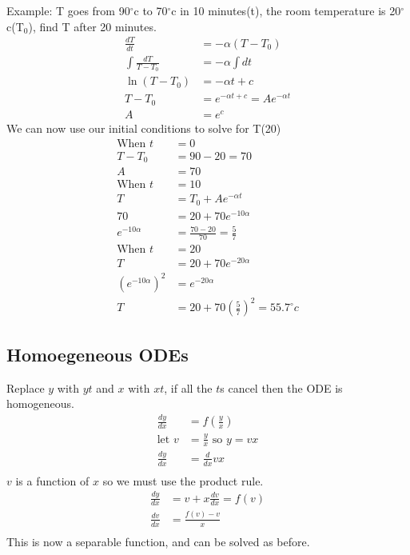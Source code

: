 \documentclass{article}
\begin{document}
Example:
T goes from 90$^\circ$c to 70$^\circ$c in 10 minutes(t), 
the room temperature is 20$^\circ$c(T$_0$), find T after 20 minutes.
\begin{align*}
    \frac{dT}{dt} &= -\alpha(T-T_0)\\
    \int \frac{dT}{T-T_0} &= -\alpha \int dt\\
    \ln(T-T_0) &= -\alpha t + c\\
    T-T_0 &= e^{-\alpha t + c} = Ae^{-\alpha t}\\
    A &= e^c
\end{align*}
We can now use our initial conditions to solve for T(20)
\begin{align*}
    \textrm{When } t &= 0\\
    T - T_0 &= 90 - 20 = 70\\
    A &= 70\\
    \textrm{When } t &= 10\\
    T &= T_0 + Ae^{-\alpha t}\\
    70 &= 20 + 70e^{-10\alpha }\\
    e^{-10\alpha} &= \frac{70-20}{70} = \frac{5}{7}\\
    \textrm{When } t &= 20\\
    T &= 20 + 70e^{-20\alpha}\\
    (e^{-10\alpha})^2 &= e^{-20\alpha}\\
    T &= 20 + 70\left(\frac{5}{7}\right)^2 = 55.7^\circ c
\end{align*}
\newpage
\subsection{Homoegeneous ODEs}
Replace $y$ with $yt$ and $x$ with $xt$, if all the $t$s cancel then the ODE is homogeneous.
\begin{align*}
    \frac{dy}{dx} &= f\left(\frac{y}{x}\right)\\
    \textrm{let }v &= \frac{y}{x} \textrm{ so } y = vx\\
    \frac{dy}{dx} &= \frac{d}{dx}vx\\
\end{align*}
$v$ is a function of $x$ so we must use the product rule.
\begin{align*}
    \frac{dy}{dx} &= v + x\frac{dv}{dx} = f(v)\\
    \frac{dv}{dx} &= \frac{f(v) - v}{x}\\
\end{align*}
This is now a separable function, and can be solved as before.
\end{document}

